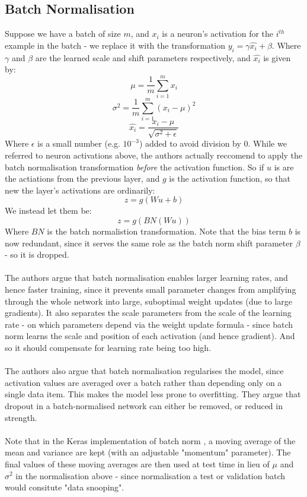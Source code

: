 \documentclass[11pt]{article} %
\theoremstyle{plain}
\theoremstyle{definition}
\begin{document}
\subsection{Batch Normalisation} \label{Batch-Norm}
Suppose we have a batch of size \(m\), and \(x_i\) is a neuron's activation for the \(i^{th}\) example in the batch - we replace it with the transformation \(y_i = \gamma \hat{x_i} + \beta\). Where \(\gamma\) and \(\beta\) are the learned scale and shift parameters respectively, and \(\hat{x_i}\) is given by: 
\[ \mu = \dfrac{1}{m} \sum_{i=1}^m x_i \]
\[ \sigma^2 = \dfrac{1}{m} \sum_{i=1}^m (x_i - \mu)^2 \]
\[ \hat{x_i} = \dfrac{x_i - \mu}{\sqrt{\sigma^2 + \epsilon}} \]
\noindent
Where \(\epsilon\) is a small number (e.g. \(10^{-3}\)) added to avoid division by 0. While we referred to neuron activations above, the authors actually reccomend to apply the batch normalisation transformation \textit{before} the activation function. So if \(u\) is are the actiations from the previous layer, and \(g\) is the activation function, so that new the layer's activations are ordinarily:
\[ z = g(Wu + b) \]
We instead let them be:
\[ z = g(BN(Wu)) \]
Where \(BN\) is the batch normalistion transformation. Note that the bias term \(b\) is now redundant, since it serves the same role as the batch norm shift parameter \(\beta\) - so it is dropped.
\\
\\
\noindent
The authors argue that batch normalisation enables larger learning rates, and hence faster training, since it prevents small parameter changes from amplifying through the whole network into large, suboptimal weight updates (due to large gradients). It also separates the scale parameters from the scale of the learning rate - on which parameters depend via the weight update formula - since batch norm learns the scale and position of each activation (and hence gradient). And so it should compensate for learning rate being too high. 
\\
\\
\noindent
The authors also argue that batch normalisation regularises the model, since activation values are averaged over a batch rather than depending only on a single data item. This makes the model less prone to overfitting. They argue that dropout in a batch-normalised network can either be removed, or reduced in strength.
\\
\\
\noindent
Note that in the Keras implementation of batch norm \cite{keras_docs_batch_norm}, a moving average of the mean and variance are kept (with an adjustable "momentum" parameter). The final values of these moving averages are then used at test time in lieu of \(\mu\) and \(\sigma^2\) in the normalisation above - since normalisation a test or validation batch would consitute "data snooping".
\end{document}
